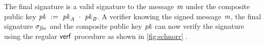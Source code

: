 \begin{center}
\end{center}

The final signature is a valid signature to the message $\mathit{m}$ under the composite public key $\mathit{pk} ~:=~ \mathit{pk}_{\mathit{A}} ~\cdot~ \mathit{pk}_{\mathit{B}}$.
A verifier knowing the signed message $\mathit{m}$, the final signature $\sigma_{\mathit{fin}}$ and the composite public key $\mathit{pk}$ can now verify the signature using the regular $\mathsf{verf}$ procedure as shown in \cref{fig:schnorr} .

